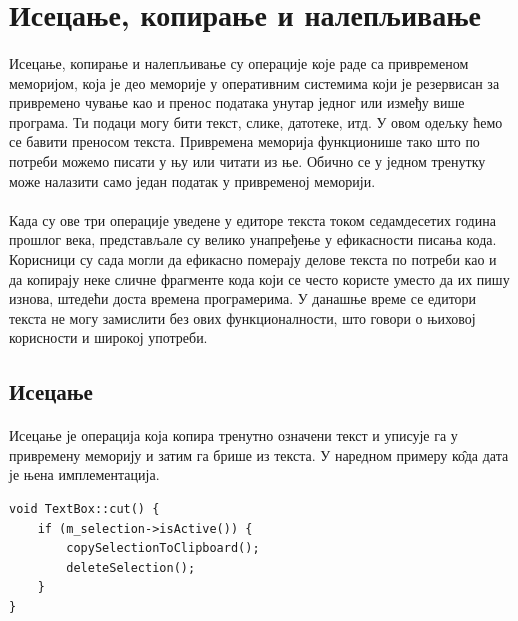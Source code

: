 \documentclass[12pt,oneside]{memoir}
\begin{document}
\section{Исецање, копирање и налепљивање}
\paragraph{}
Исецање, копирање и налепљивање су операције које раде са привременом меморијом, 
која је део меморије у оперативним системима који је резервисан за привремено чување 
као и пренос података унутар једног или између више програма. Ти подаци могу бити текст,
слике, датотеке, итд. У овом одељку ћемо се бавити преносом текста. Привремена 
меморија функционише тако што по потреби можемо писати у њу или читати из ње. 
Обично се у једном тренутку може налазити само један податак у привременој меморији.

\paragraph{}
Када су ове три операције уведене у едиторе текста током седамдесетих година 
прошлог века, представљале су велико унапређење у ефикасности писања кода.
Корисници су сада могли да ефикасно померају делове текста по потреби као
и да копирају неке сличне фрагменте кода који се често користе уместо да их
пишу изнова, штедећи доста времена програмерима. У данашње време се едитори текста не
могу замислити без ових функционалности, што говори о њиховој корисности и широкој
употреби.

\subsection{Исецање}
\paragraph{}
Исецање је операција која копира тренутно означени текст и уписује га у 
привремену меморију и затим га брише из текста. У наредном примеру к\^{о}да дата је њена
имплементација.

\begin{verbatim}
void TextBox::cut() {
	if (m_selection->isActive()) {
		copySelectionToClipboard();
		deleteSelection();
	}
}
\end{verbatim}
\end{document}
